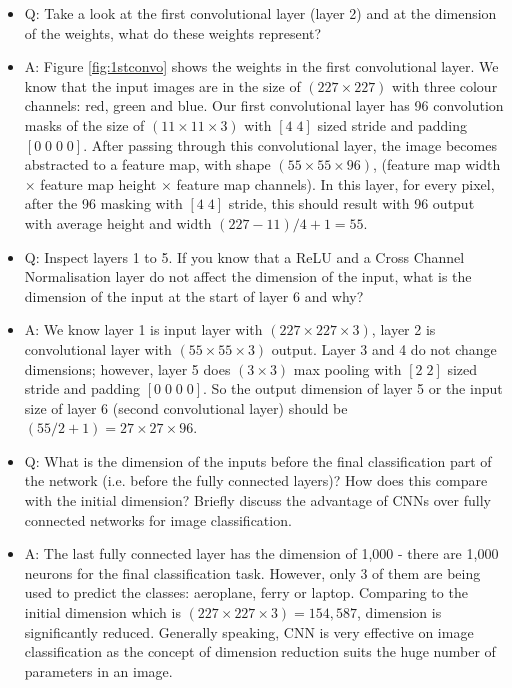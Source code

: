 \documentclass{article}
\begin{document}
\begin{itemize}

    \item Q: Take a look at the first convolutional layer (layer 2) and at the dimension of the weights, what do these weights represent?
    \item A: Figure \ref{fig:1stconvo} shows the weights in the first convolutional layer. We know that the input images are in the size of $(227\times227)$ with three colour channels: red, green and blue. Our first convolutional layer has 96 convolution masks of the size of $(11\times11\times3)$ with $[4\;4]$ sized stride and padding $[0\;0\;0\;0]$. After passing through this convolutional layer, the image becomes abstracted to a feature map, with shape $(55\times55\times96)$, (feature map width $\times$ feature map height $\times$ feature map channels). In this layer, for every pixel, after the  96 masking with $[4\;4]$ stride, this should result with 96 output with average height and width $(227-11)/4+1=55$.
    \item Q: Inspect layers 1 to 5. If you know that a ReLU and a Cross Channel Normalisation layer do not affect the dimension of the input, what is the dimension of the input at the start of layer 6 and why?
    \item A: We know layer 1 is input layer with $(227\times227\times3)$, layer 2 is convolutional layer with $(55\times55\times3)$ output. Layer 3 and 4 do not change dimensions; however, layer 5 does $(3\times3)$ max pooling with $[2\;2]$ sized stride and padding $[0\;0\;0\;0]$. So the output dimension of layer 5 or the input size of layer 6 (second convolutional layer) should be $(55/2+1)=27\times27\times96$.
    \item Q: What is the dimension of the inputs before the final classification part of the network (i.e. before the fully connected layers)? How does this compare with the initial dimension? Briefly discuss the advantage of CNNs over fully connected networks for image classification.
    \item A: The last fully connected layer has the dimension of 1,000 - there are 1,000 neurons for the final classification task. However, only 3 of them are being used to predict the classes: aeroplane, ferry or laptop. Comparing to the initial dimension which is $(227\times227\times3)=154,587$, dimension is significantly reduced. Generally speaking, CNN is very effective on image classification as the concept of dimension reduction suits the huge number of parameters in an image.
\end{itemize}
\end{document}
